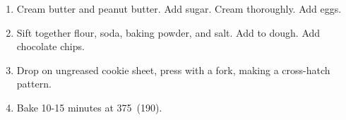 
\begin{ingredients}
\end{ingredients}


\begin{recipe}
  \begin{enumerate}
  \item Cream butter and peanut butter.  Add sugar.  Cream thoroughly.
    Add eggs.

  \item Sift together flour, soda, baking powder, and salt.  Add to
    dough.  Add chocolate chips.

  \item Drop on ungreased cookie sheet, press with a fork, making a
    cross-hatch pattern.

  \item Bake 10-15 minutes at 375\F\ (190\degreeC).

  \end{enumerate}
\end{recipe}
